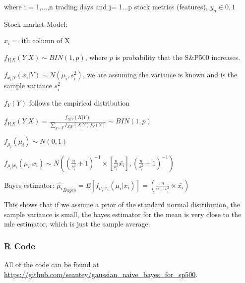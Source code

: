\documentclass{article}
\begin{document}
\begin{center}
where i = 1,...,n trading days and j= 1...p stock metrics (features), $y_{n} \in {0,1}$
\end{center}

Stock market Model:

$x_i =$ ith column of X\newline

$ f_{Y|X}(Y|X) \sim BIN(1,p)$,  where $p$ is probability that the S\&P500 increases.\newline

$ f_{x_{i}|Y}(x_{i}|Y) \sim N(\mu_{i},s_i^2)$, we are assuming the variance is known and is the sample variance $s_i^2$\newline

$f_Y(Y)$ follows the empirical distribution\newline

$f_{Y|X}(Y|X) = \frac{f_{X|Y}(X|Y)}{\sum_{y \in Y}f_{X|Y}(X|Y)f_{Y}(Y)} \sim BIN(1,p)$\newline

$f_{\mu_{i}}(\mu_{i}) \sim N(0,1)$\newline

$ f_{\mu_{i}|x_{i}}(\mu_{i}|x_{i}) \sim N((\frac{n}{s_i^2} + 1)^{-1}\times[\frac{n}{s_i^2}\bar{x_{i}}],(\frac{n}{s_i^2} + 1)^{-1})$\newline


Bayes estimator:  $\hat{\mu_{i}}_{Bayes} = E[f_{\mu_{i}|x_{i}}(\mu_{i}|x_{i})] = (\frac{n}{n + s_i^2}\times \bar{x_{i}})$\newline



This shows that if we assume a prior of the standard normal distribution, the sample variance is small, the bayes estimator for the mean is very close to the mle estimator, which is just the sample average. 



\newpage

\subsubsection{R Code}

All of the code can be found at \url{https://github.com/seantey/gaussian_naive_bayes_for_sp500}.
\end{document}
